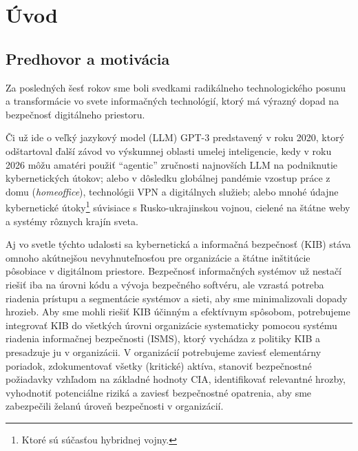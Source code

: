 \chapter*{Úvod}

\section*{Predhovor a motivácia}
Za posledných šesť rokov sme boli svedkami radikálneho technologického posunu a transformácie vo svete informačných technológií,
ktorý má výrazný dopad na bezpečnosť digitálneho priestoru.

Či už ide o veľký jazykový model (LLM) GPT-3 predstavený v roku 2020, ktorý odštartoval ďalší závod vo výskumnej oblasti umelej
inteligencie, kedy v roku 2026 môžu amatéri použiť \enquote{agentic} zručnosti najnovších LLM na podniknutie kybernetických útokov;
alebo v dôsledku globálnej pandémie vzostup práce z domu (\emph{homeoffice}), technológii VPN a digitálnych služieb; alebo mnohé údajne
kybernetické útoky\footnote{Ktoré sú súčasťou hybridnej vojny.} súvisiace s Rusko-­ukrajinskou vojnou, cielené na štátne weby a systémy
rôznych krajín sveta.

Aj vo svetle týchto udalosti sa kybernetická a informačná bezpečnosť (KIB) stáva omnoho akútnejšou nevyhnuteľnosťou pre organizácie a štátne
inštitúcie pôsobiace v digitálnom priestore. Bezpečnosť informačných systémov už nestačí riešiť iba na úrovni kódu a vývoja
bezpečného softvéru, ale vzrastá potreba riadenia prístupu a segmentácie systémov a sieti, aby sme minimalizovali dopady hrozieb.
Aby sme mohli riešiť KIB účinným a efektívnym spôsobom, potrebujeme integrovať KIB do všetkých úrovni organizácie systematicky pomocou
systému riadenia informačnej bezpečnosti (ISMS), ktorý vychádza z politiky KIB a presadzuje ju v organizácii. V organizácií potrebujeme
zaviesť elementárny poriadok, zdokumentovať všetky (kritické) aktíva, stanoviť bezpečnostné požiadavky vzhľadom na základné hodnoty CIA,
identifikovať relevantné hrozby, vyhodnotiť potenciálne riziká a zaviesť bezpečnostné opatrenia, aby sme zabezpečili želanú úroveň
bezpečnosti v organizácií.

